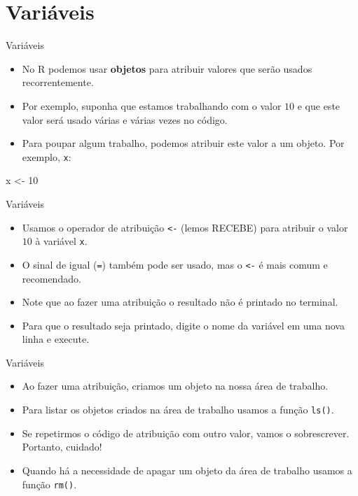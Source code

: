 \documentclass[
  ignorenonframetext,
  serif,
  professionalfont,
  usenames,
  dvipsnames,
  aspectratio = 169]{beamer}
\newenvironment{Shaded}{}{}
\newcommand{\DecValTok}[1]{#1}
\newcommand{\NormalTok}[1]{#1}
\newcommand{\OtherTok}[1]{\textcolor[rgb]{1.00,0.25,0.00}{#1}}
\renewenvironment{Shaded}{
    \vspace{2pt}
    \begin{tcolorbox}[
      boxrule=0pt,      %
      colframe=gray!10, %
      colback=gray!10,  %
      arc=1em,          %
      sharp corners,
      boxsep=0.5em,     %
      left=3pt, right=3pt, top=3pt, bottom=3pt, %
      grow to left by=0mm,
      grow to right by=6pt,
      ]
    }{
    \end{tcolorbox}
    \vspace{-3pt}
    }
\begin{document}
\section{Variáveis}\label{variuxe1veis}

\begin{frame}[fragile]{Variáveis}
\label{variuxe1veis-1}
\begin{itemize}
\item
  No R podemos usar \textbf{objetos} para atribuir valores que serão
  usados recorrentemente.
\item
  Por exemplo, suponha que estamos trabalhando com o valor \(10\) e que
  este valor será usado várias e várias vezes no código.
\item
  Para poupar algum trabalho, podemos atribuir este valor a um objeto.
  Por exemplo, \texttt{x}:
\end{itemize}

\begin{Shaded}
\begin{Highlighting}[]
\NormalTok{x }\OtherTok{\textless{}{-}} \DecValTok{10}
\end{Highlighting}
\end{Shaded}
\end{frame}

\begin{frame}[fragile]{Variáveis}
\label{variuxe1veis-2}
\begin{itemize}
\item
  Usamos o operador de atribuição \texttt{\textless{}-} (lemos RECEBE)
  para atribuir o valor \(10\) à variável \texttt{x}.
\item
  O sinal de igual (\texttt{=}) também pode ser usado, mas o
  \texttt{\textless{}-} é mais comum e recomendado.
\item
  Note que ao fazer uma atribuição o resultado não é printado no
  terminal.
\item
  Para que o resultado seja printado, digite o nome da variável em uma
  nova linha e execute.
\end{itemize}
\end{frame}

\begin{frame}[fragile]{Variáveis}
\label{variuxe1veis-3}
\begin{itemize}
\item
  Ao fazer uma atribuição, criamos um objeto na nossa área de trabalho.
\item
  Para listar os objetos criados na área de trabalho usamos a função
  \texttt{ls()}.
\item
  Se repetirmos o código de atribuição com outro valor, vamos o
  sobrescrever. Portanto, cuidado!
\item
  Quando há a necessidade de apagar um objeto da área de trabalho usamos
  a função \texttt{rm()}.
\end{itemize}
\end{frame}
\end{document}
